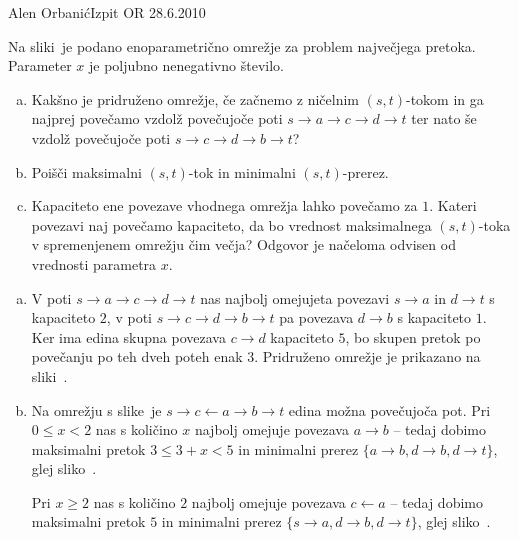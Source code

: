 \begin{naloga}{Alen Orbanić}{Izpit OR 28.6.2010}
\begin{vprasanje}
Na sliki~\fig je podano enoparametrično omrežje
za problem največjega pretoka.
Parameter $x$ je poljubno nenegativno število.

\begin{enumerate}[(a)]
\item Kakšno je pridruženo omrežje,
če začnemo z ničelnim $(s, t)$-tokom
in ga najprej povečamo vzdolž povečujoče poti $s \to a \to c \to d \to t$
ter nato še vzdolž povečujoče poti $s \to c \to d \to b \to t$?

\item Poišči maksimalni $(s, t)$-tok in minimalni $(s, t)$-prerez.

\item Kapaciteto ene povezave vhodnega omrežja lahko povečamo za $1$.
Kateri povezavi naj povečamo kapaciteto,
da bo vrednost maksimalnega $(s, t)$-toka v spremenjenem omrežju čim večja?
Odgovor je načeloma odvisen od vred\-no\-sti parametra $x$.
\end{enumerate}

\begin{slika}
\pgfslika
{}
\end{slika}
\end{vprasanje}

\begin{odgovor}
\begin{enumerate}[(a)]
\item V poti $s \to a \to c \to d \to t$
nas najbolj omejujeta povezavi $s \to a$ in $d \to t$ s kapaciteto $2$,
v poti $s \to c \to d \to b \to t$ pa povezava $d \to b$ s kapaciteto $1$.
Ker ima edina skupna povezava $c \to d$ kapaciteto $5$,
bo skupen pretok po povečanju po teh dveh poteh enak $3$.
Pridruženo omrežje je prikazano na sliki~.

\item Na omrežju s slike~
je $s \to c \gets a \to b \to t$ edina možna povečujoča pot.
Pri $0 \le x < 2$ nas s količino $x$ najbolj omejuje povezava $a \to b$
-- tedaj dobimo maksimalni pretok $3 \le 3+x < 5$
in minimalni prerez $\{a \to b, d \to b, d \to t\}$,
glej sliko~.

Pri $x \ge 2$ nas s količino $2$ najbolj omejuje povezava $c \gets a$
-- tedaj dobimo maksimalni pretok $5$
in minimalni prerez $\{s \to a, d \to b, d \to t\}$,
glej sliko~.


\end{enumerate}
\end{odgovor}
\end{naloga}
